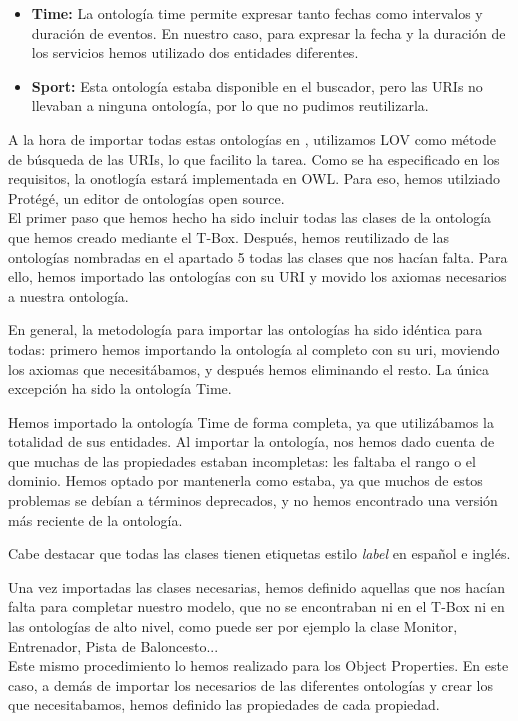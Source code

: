\documentclass[a4paper,12pt]{article}
\begin{document}
	\begin{itemize}
		\item \textbf{Time:} La ontología time permite expresar tanto fechas como intervalos y duración de eventos. En nuestro caso, para expresar la fecha y la duración de los servicios hemos utilizado dos entidades diferentes.
		\item \textbf{Sport:} Esta ontología estaba disponible en el buscador, pero las URIs no llevaban a ninguna ontología, por lo que no pudimos reutilizarla. 
	\end{itemize}
	A la hora de importar todas estas ontologías en , utilizamos LOV como métode de búsqueda de las URIs, lo que facilito la tarea. 
	Como se ha especificado en los requisitos, la onotlogía estará implementada en OWL. Para eso, hemos utilziado Protégé, un editor de ontologías open source. \\
	
	El primer paso que hemos hecho ha sido incluir todas las clases de la ontología que hemos creado mediante el T-Box. Después, hemos reutilizado de las ontologías nombradas en el apartado 5 todas las clases que nos hacían falta. Para ello, hemos importado las ontologías con su URI y movido los axiomas necesarios a nuestra ontología.
	
	En general, la metodología para importar las ontologías ha sido idéntica para todas: primero hemos importando la ontología al completo con su uri, moviendo los axiomas que necesitábamos, y después hemos eliminando el resto. La única excepción ha sido la ontología Time. 
	
	Hemos importado la ontología Time de forma completa, ya que utilizábamos la totalidad de sus entidades. Al importar la ontología, nos hemos dado cuenta de que muchas de las propiedades estaban incompletas: les faltaba el rango o el dominio. Hemos optado por mantenerla como estaba, ya que muchos de estos problemas se debían a términos deprecados, y no hemos encontrado una versión más reciente de la ontología.
	
	Cabe destacar que todas las clases tienen etiquetas estilo \textit{label} en español e inglés.
	
	Una vez importadas las clases necesarias, hemos definido aquellas que nos hacían falta para completar nuestro modelo, que no se encontraban ni en el T-Box ni en las ontologías de alto nivel, como puede ser por ejemplo la clase Monitor, Entrenador, Pista de Baloncesto... \\
		
	Este mismo procedimiento lo hemos realizado para los Object Properties. En este caso, a demás de importar los necesarios de las diferentes ontologías y crear los que necesitabamos, hemos definido las propiedades de cada propiedad. \\
		
\end{document}

